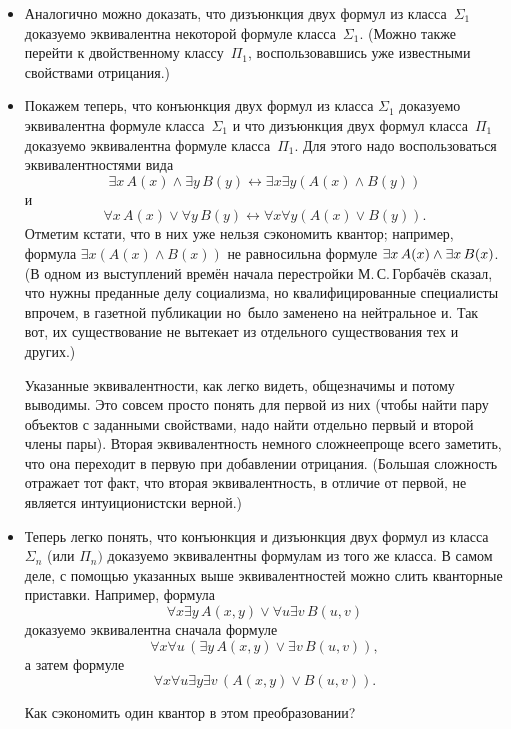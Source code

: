 \begin{itemize}
Общее рассуждение (для любых двух формул из класса $\Pi_1$)
почти столь же просто, надо лишь переименовать связанные
переменные, пользуясь теоремой~\ref{renaming-variables-theorem}
(с.~\pageref{renaming-variables-theorem}).
        \item
Аналогично можно доказать, что дизъюнкция двух формул
из класса~$\Sigma_1$ доказуемо эквивалентна некоторой формуле
класса~$\Sigma_1$. (Можно также перейти к двойственному
классу~$\Pi_1$, воспользовавшись уже известными свойствами
отрицания.)
        \item
Покажем теперь, что конъюнкция двух формул из класса $\Sigma_1$
доказуемо эквивалентна формуле класса~$\Sigma_1$ и что
дизъюнкция двух формул класса~$\Pi_1$ доказуемо эквивалентна
формуле класса~$\Pi_1$. Для этого надо воспользоваться
эквивалентностями вида
        $$
\exists x\,A(x) \land
\exists y\,B(y) \leftrightarrow
\exists x \exists y (A(x)\land B(y))
        $$
и
        $$
\forall x\,A(x) \lor
\forall y\,B(y) \leftrightarrow
\forall x \forall y (A(x)\lor B(y)).
        $$
Отметим кстати, что в них уже нельзя сэкономить квантор;
например, формула $\exists x (A(x)\land B(x))$ не равносильна
формуле $\exists x\, A(x)\hm\land \exists x\, B(x)$. (В одном из
выступлений времён начала перестройки
М.\,С.\,Гор\-ба\-чёв сказал, что нужны 
преданные делу социализма, но квалифицированные специалисты\т
впрочем, в газетной публикации  но\ было заменено на
нейтральное  и. Так вот, их существование не вытекает из
отдельного существования тех и других.)

Указанные эквивалентности, как легко видеть, общезначимы и
потому выводимы. Это совсем просто понять для первой из них
(чтобы найти пару объектов с заданными свойствами, надо найти
отдельно первый и второй члены пары). Вторая эквивалентность
немного сложнее\т проще всего заметить, что она переходит в
первую при добавлении отрицания. (Большая сложность отражает тот
факт, что вторая эквивалентность, в отличие от первой, не
является интуиционистски верной.)

        \item
        \label{sigma-pi-closed}%
Теперь легко понять, что конъюнкция и дизъюнкция двух формул
из класса $\Sigma_n$ (или $\Pi_n)$ доказуемо эквивалентны
формулам из того же класса. В самом деле, с помощью указанных
выше эквивалентностей можно слить кванторные приставки.
Например, формула
        $$
\forall x \exists y \, A(x,y) \lor \forall u \exists v \, B(u,v)
        $$
доказуемо эквивалентна сначала формуле
        $$
\forall x \forall u \, (\exists y\, A(x,y) \lor \exists v\, B(u,v)),
        $$
а затем формуле
        $$
\forall x \forall u \exists y \exists v\, (A(x,y)\lor B(u,v)).
        $$

\begin{problem}
Как сэкономить один квантор в этом преобразовании?
\end{problem}

\end{itemize}

